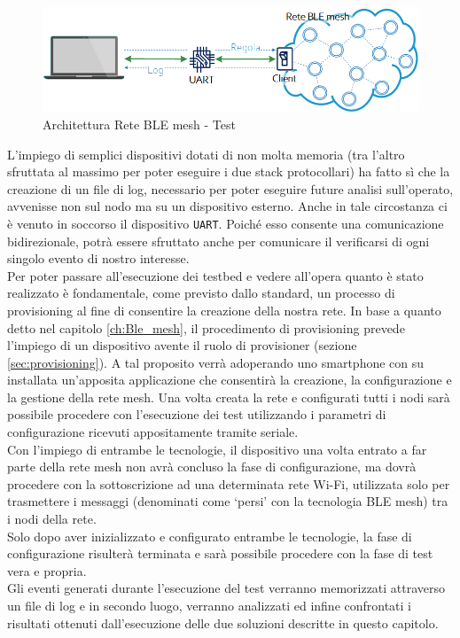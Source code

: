 \begin{figure}[!ht]
    \centering
    \includegraphics[width = \textwidth]{images/Uart.png}
    \caption{Architettura Rete BLE mesh - Test}
    \label{fig:mesh_network_uart}
\end{figure}

\noindent L'impiego di semplici dispositivi dotati di non molta memoria (tra l'altro sfruttata al massimo per poter eseguire i due stack protocollari) ha fatto sì che la creazione di un file di log, necessario per poter eseguire future analisi sull'operato, avvenisse non sul nodo ma su un dispositivo esterno. Anche in tale circostanza ci è venuto in soccorso il dispositivo \texttt{UART}. Poiché esso consente una comunicazione bidirezionale, potrà essere sfruttato anche per comunicare il verificarsi di ogni singolo evento di nostro interesse.\\

\noindent Per poter passare all'esecuzione dei testbed e vedere all'opera quanto è stato realizzato è fondamentale, come previsto dallo standard, un processo di provisioning al fine di consentire la creazione della nostra rete. In base a quanto detto nel capitolo \ref{ch:Ble_mesh}, il procedimento di provisioning prevede l'impiego di un dispositivo avente il ruolo di provisioner (sezione \ref{sec:provisioning}).
A tal proposito verrà adoperando uno smartphone con su installata un'apposita applicazione che consentirà la creazione, la configurazione e la gestione della rete mesh. Una volta creata la rete e configurati tutti i nodi sarà possibile procedere con l'esecuzione dei test utilizzando i parametri di configurazione ricevuti appositamente tramite seriale.\\
Con l'impiego di entrambe le tecnologie, il dispositivo una volta entrato a far parte della rete mesh non avrà concluso la fase di configurazione, ma dovrà procedere con la sottoscrizione ad una determinata rete Wi-Fi, utilizzata solo per trasmettere i messaggi (denominati come `persi' con la tecnologia BLE mesh) tra i nodi della rete. \\
Solo dopo aver inizializzato e configurato entrambe le tecnologie, la fase di configurazione risulterà terminata e sarà possibile procedere con la fase di test vera e propria.\\

\noindent Gli eventi generati durante l'esecuzione del test verranno memorizzati attraverso un file di log e in secondo luogo, verranno analizzati ed infine confrontati i risultati ottenuti dall'esecuzione delle due soluzioni descritte in questo capitolo.\\
